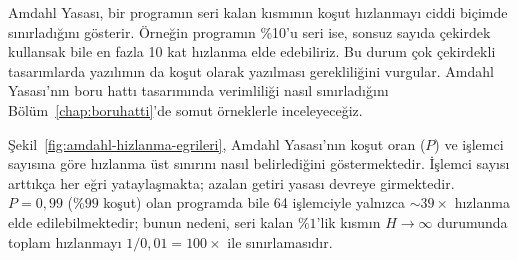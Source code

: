 \begin{bilginot}
Amdahl Yasası, bir programın seri kalan kısmının koşut hızlanmayı ciddi biçimde sınırladığını gösterir. Örneğin programın \%10'u seri ise, sonsuz sayıda çekirdek kullansak bile en fazla 10 kat hızlanma elde edebiliriz. Bu durum çok çekirdekli tasarımlarda yazılımın da koşut olarak yazılması gerekliliğini vurgular. Amdahl Yasası'nın boru hattı tasarımında verimliliği nasıl sınırladığını Bölüm~\ref{chap:boruhatti}'de somut örneklerle inceleyeceğiz.
\end{bilginot}

Şekil~\ref{fig:amdahl-hizlanma-egrileri}, Amdahl Yasası'nın koşut oran ($P$) ve işlemci sayısına göre hızlanma üst sınırını nasıl belirlediğini göstermektedir. İşlemci sayısı arttıkça her eğri yataylaşmakta; azalan getiri yasası devreye girmektedir. $P=0{,}99$ ($\%99$ koşut) olan programda bile 64 işlemciyle yalnızca $\sim$$39\times$ hızlanma elde edilebilmektedir; bunun nedeni, seri kalan $\%1$'lik kısmın $H\to\infty$ durumunda toplam hızlanmayı $1/0{,}01 = 100\times$ ile sınırlamasıdır.

